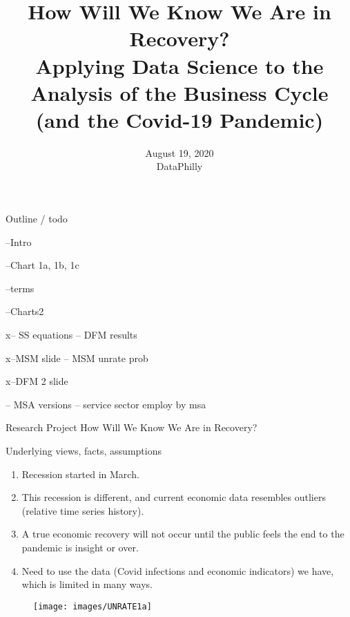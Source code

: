 \documentclass{beamer}
\title[Topic]{
	How Will We Know We Are in Recovery? \\
	{\small 
	Applying Data Science to the Analysis of the Business Cycle \\ (and the Covid-19 Pandemic)}
} %
\author[Michael Boldin]{}%
\institute[Fox School of Business, Temple University] %
{
Michael Boldin, PhD. \\	
Fox School of Business, Temple University\\
Department of Statistical Science 
}
\date{August 19, 2020 \\ DataPhilly}
\begin{document}

\begin{frame}
\titlepage %
\end{frame}


\begin{frame}
	
	Outline / todo
	
	--Intro
	
	--Chart 1a, 1b, 1c
	
	--terms
	
    --Charts2
    
    x-- SS equations
    -- DFM results
    
    x--MSM slide
    -- MSM unrate prob

    x--DFM 2 slide
    
    -- MSA versions
    -- service sector employ by msa
     
    	
%
	
\end{frame}


\begin{frame}
	
	Research Project
	{\Large How Will We Know We Are in Recovery?} 
	
	\medskip
	Underlying views, facts, assumptions
	\begin{enumerate}
	\item Recession started in March.
	\item This recession is different, and current economic data resembles outliers (relative time series history).  
	\item A true economic recovery will not occur until the public feels the end to the pandemic is insight or over.
	\item Need to use the data (Covid infections and economic indicators) we have, which is limited in many ways.
	\end{enumerate}
		
\end{frame}


\begin{frame}
	
\begin{figure}
	\centering
	\texttt{[image: images/UNRATE1a]}
\end{figure}

\end{frame}
\end{document}
